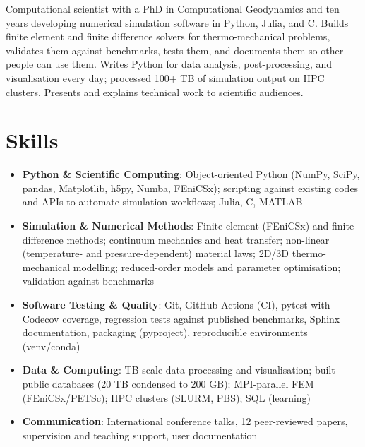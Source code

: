 \documentclass[11pt,a4paper,sans]{moderncv}
\begin{document}
\makecvtitle


\vspace{6pt}
\small{Computational scientist with a PhD in Computational Geodynamics and ten years developing numerical simulation software in Python, Julia, and C. Builds finite element and finite difference solvers for thermo-mechanical problems, validates them against benchmarks, tests them, and documents them so other people can use them. Writes Python for data analysis, post-processing, and visualisation every day; processed 100+ TB of simulation output on HPC clusters. Presents and explains technical work to scientific audiences.}


\section{Skills}
\vspace{1pt}
\begin{itemize}

\item \textbf{Python \& Scientific Computing}: Object-oriented Python (NumPy, SciPy, pandas, Matplotlib, h5py, Numba, FEniCSx); scripting against existing codes and APIs to automate simulation workflows; Julia, C, MATLAB

\item \textbf{Simulation \& Numerical Methods}: Finite element (FEniCSx) and finite difference methods; continuum mechanics and heat transfer; non-linear (temperature- and pressure-dependent) material laws; 2D/3D thermo-mechanical modelling; reduced-order models and parameter optimisation; validation against benchmarks

\item \textbf{Software Testing \& Quality}: Git, GitHub Actions (CI), pytest with Codecov coverage, regression tests against published benchmarks, Sphinx documentation, packaging (pyproject), reproducible environments (venv/conda)

\item \textbf{Data \& Computing}: TB-scale data processing and visualisation; built public databases (20 TB condensed to 200 GB); MPI-parallel FEM (FEniCSx/PETSc); HPC clusters (SLURM, PBS); SQL (learning)

\item \textbf{Communication}: International conference talks, 12 peer-reviewed papers, supervision and teaching support, user documentation

\end{itemize}
\end{document}
